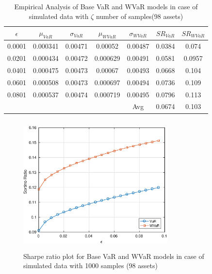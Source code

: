 \documentclass[12pt]{article}
\numberwithin{equation}{section}
\begin{document}
\begin{table}[!h]
\centering
\captionsetup{justification=centering}
\begin{tabular}{||c|c|c|c|c|c|c||}
\hline
$\epsilon$ & $\mu_{VaR}$ & $\sigma_{VaR}$ & $\mu_{WVaR}$ & $\sigma_{WVaR}$ & $SR_{VaR}$ & $SR_{WVaR}$\\
\hline
0.0001 & 0.000341 & 0.00471 & 0.00052 & 0.00487 & 0.0384 & 0.074 \\
0.0201 & 0.000434 & 0.00472 & 0.000629 & 0.00491 & 0.0581 & 0.0957 \\
0.0401 & 0.000475 & 0.00473 & 0.00067 & 0.00493 & 0.0668 & 0.104 \\
0.0601 & 0.000508 & 0.00473 & 0.000697 & 0.00494 & 0.0736 & 0.109 \\
0.0801 & 0.000537 & 0.00474 & 0.000719 & 0.00495 & 0.0796 & 0.113 \\ 
\hline
& & & & Avg & 0.0674 & 0.103 \\
\hline
\end{tabular}
\caption{Empirical Analysis of Base VaR and WVaR models in case of simulated data with $\zeta$ number of samples(98 assets)}
\label{tab:5.5}
\end{table}

\begin{figure}[!h]
\centering
\includegraphics[height=7.0cm,width=0.7\textwidth]{VaR/bse100_simulated/sr_1000_cheb.eps}
\caption{Sharpe ratio plot for Base VaR and WVaR models in case of simulated data with 1000 samples (98 assets)}
\label{fig:5.6}
\end{figure}
\end{document}
